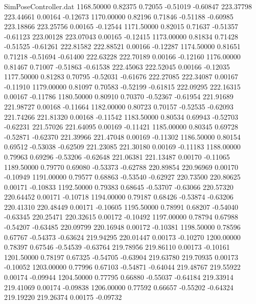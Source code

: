 \begin{filecontents}{SimPoseController.dat}
1168.50000    0.82375    0.72055    -0.51019   -0.60847  223.37798  223.44661    0.00164   -0.12673
1170.00000    0.82196    0.71846    -0.51188   -0.60985  223.18866  223.25756    0.00165   -0.12544
1171.50000    0.82015    0.71637    -0.51357   -0.61123  223.00128  223.07043    0.00165   -0.12415
1173.00000    0.81834    0.71428    -0.51525   -0.61261  222.81582  222.88521    0.00166   -0.12287
1174.50000    0.81651    0.71218    -0.51694   -0.61400  222.63228  222.70189    0.00166   -0.12160
1176.00000    0.81467    0.71007    -0.51863   -0.61538  222.45063  222.52045    0.00166   -0.12035
1177.50000    0.81283    0.70795    -0.52031   -0.61676  222.27085  222.34087    0.00167   -0.11910
1179.00000    0.81097    0.70583    -0.52199   -0.61815  222.09295  222.16315    0.00167   -0.11786
1180.50000    0.80910    0.70370    -0.52367   -0.61954  221.91689  221.98727    0.00168   -0.11664
1182.00000    0.80723    0.70157    -0.52535   -0.62093  221.74266  221.81320    0.00168   -0.11542
1183.50000    0.80534    0.69943    -0.52703   -0.62231  221.57026  221.64095    0.00169   -0.11421
1185.00000    0.80345    0.69728    -0.52871   -0.62370  221.39966  221.47048    0.00169   -0.11302
1186.50000    0.80154    0.69512    -0.53038   -0.62509  221.23085  221.30180    0.00169   -0.11183
1188.00000    0.79963    0.69296    -0.53206   -0.62648  221.06381  221.13487    0.00170   -0.11065
1189.50000    0.79770    0.69080    -0.53373   -0.62788  220.89854  220.96969    0.00170   -0.10949
1191.00000    0.79577    0.68863    -0.53540   -0.62927  220.73500  220.80625    0.00171   -0.10833
1192.50000    0.79383    0.68645    -0.53707   -0.63066  220.57320  220.64452    0.00171   -0.10718
1194.00000    0.79187    0.68426    -0.53874   -0.63206  220.41310  220.48449    0.00171   -0.10605
1195.50000    0.78991    0.68207    -0.54040   -0.63345  220.25471  220.32615    0.00172   -0.10492
1197.00000    0.78794    0.67988    -0.54207   -0.63485  220.09799  220.16948    0.00172   -0.10381
1198.50000    0.78596    0.67767    -0.54373   -0.63624  219.94295  220.01447    0.00173   -0.10270
1200.00000    0.78397    0.67546    -0.54539   -0.63764  219.78956  219.86110    0.00173   -0.10161
1201.50000    0.78197    0.67325    -0.54705   -0.63904  219.63780  219.70935    0.00173   -0.10052
1203.00000    0.77996    0.67103    -0.54871   -0.64044  219.48767  219.55922    0.00174   -0.09944
1204.50000    0.77795    0.66880    -0.55037   -0.64184  219.33914  219.41069    0.00174   -0.09838
1206.00000    0.77592    0.66657    -0.55202   -0.64324  219.19220  219.26374    0.00175   -0.09732

\end{filecontents}
